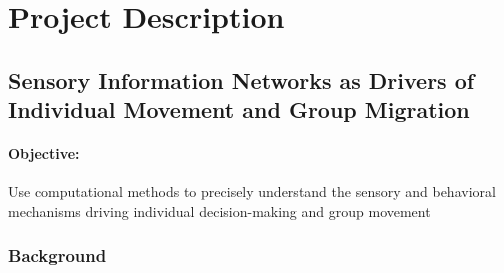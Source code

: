 \documentclass[11pt,a4paper,oneside]{article}
\begin{document}
	\section{Project Description}
	\subsection[Sensory Information Networks]{Sensory Information Networks as Drivers of Individual Movement and Group Migration} \label{project1}
	\paragraph{Objective:} 
	Use computational methods to precisely understand the sensory and behavioral mechanisms driving individual decision-making and group movement
	\subsubsection{Background}
\end{document}
